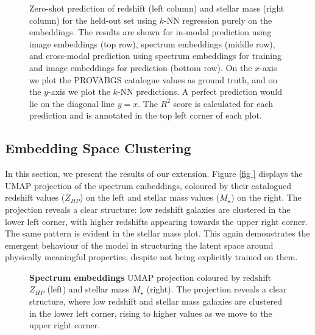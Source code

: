 \documentclass[a4paper,12pt]{article}
\begin{document}
\begin{figure}[H]
    \caption{Zero-shot prediction of redshift (left column) and stellar mass (right column) for the held-out set using $k$-NN regression purely on the embeddings. The results are shown for in-modal prediction using image embeddings (top row), spectrum embeddings (middle row), and cross-modal prediction using spectrum embeddings for training and image embeddings for prediction (bottom row). On the $x$-axis we plot the PROVABGS catalogue values as ground truth, and on the $y$-axis we plot the $k$-NN predictions. A perfect prediction would lie on the diagonal line $ y = x $. The $R^2$ score is calculated for each prediction and is annotated in the top left corner of each plot.}
    \label{fig:zeroshot}
\end{figure}



\subsection{Embedding Space Clustering}
In this section, we present the results of our extension. Figure \ref{fig
} displays the UMAP projection of the spectrum embeddings, coloured by their catalogued redshift values ($Z_{HP}$) on the left and stellar mass values ($M_{\star}$) on the right. The projection reveals a clear structure: low redshift galaxies are clustered in the lower left corner, with higher redshifts appearing towards the upper right corner. The same pattern is evident in the stellar mass plot. This again demonstrates the emergent behaviour of the model in structuring the latent space around physically meaningful properties, despite not being explicitly trained on them.


\begin{figure}[H]
    \centering
    \caption{\textbf{Spectrum embeddings} UMAP projection coloured by redshift $Z_{HP}$ (left) and stellar mass $M_{\star}$ (right). The projection reveals a clear structure, where low redshift and stellar mass galaxies are clustered in the lower left corner, rising to higher values as we move to the upper right corner.}
    \label{fig:umap_of_spectra}
\end{figure}
\end{document}
